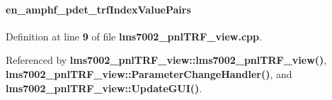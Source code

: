\paragraph[{en\+\_\+amphf\+\_\+pdet\+\_\+trf\+Index\+Value\+Pairs}]{ en\+\_\+amphf\+\_\+pdet\+\_\+trf\+Index\+Value\+Pairs\hspace{0.3cm}{\ttfamily [static]}}\label{lms7002__pnlTRF__view_8cpp_a4fa3d190e46950b9652897b7807a22eb}


Definition at line {\bf 9} of file {\bf lms7002\+\_\+pnl\+T\+R\+F\+\_\+view.\+cpp}.



Referenced by {\bf lms7002\+\_\+pnl\+T\+R\+F\+\_\+view\+::lms7002\+\_\+pnl\+T\+R\+F\+\_\+view()}, {\bf lms7002\+\_\+pnl\+T\+R\+F\+\_\+view\+::\+Parameter\+Change\+Handler()}, and {\bf lms7002\+\_\+pnl\+T\+R\+F\+\_\+view\+::\+Update\+G\+U\+I()}.

